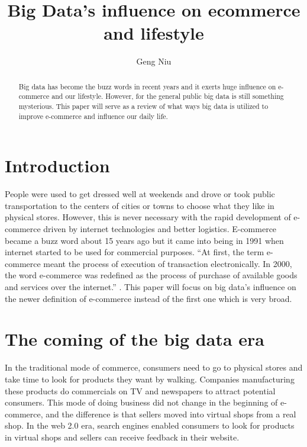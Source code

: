 \documentclass[sigconf]{acmart}
\begin{document}
\title{Big Data's influence on ecommerce and lifestyle}


\author{Geng Niu}



\begin{abstract}
Big data has become the buzz words in recent years and it exerts huge influence on e-commerce and our lifestyle. However, for the general public big data is still something mysterious. This paper will serve as a review of what ways big data is utilized to improve e-commerce and influence our daily life.
\end{abstract}



\maketitle

\section{Introduction}
People were used to get dressed well at weekends and drove or took public transportation to the centers of cities or towns to choose what they like in physical stores. However, this is never necessary with the rapid development of e-commerce driven by internet technologies and better logistics.  E-commerce became a buzz word about 15 years ago but it came into being in 1991 when internet started to be used for commercial purposes. ``At first, the term e-commerce meant the process of execution of transaction electronically. In 2000, the word e-commerce was redefined as the process of purchase of available goods and services over the internet.'' \cite{2008}. This paper will focus on big data’s influence on the newer definition of e-commerce instead of the first one which is very broad.
\section{The coming of the big data era}
In the traditional mode of commerce, consumers need to go to physical stores and take time to look for products they want by walking. Companies manufacturing these products do commercials on TV and newspapers to attract potential consumers. This mode of doing business did not change in the beginning of e-commerce, and the difference is that sellers moved into virtual shops from a real shop. In the web 2.0 era, search engines enabled consumers to look for products in virtual shops and sellers can receive feedback in their website\cite{Chen2012}.
\end{document}
